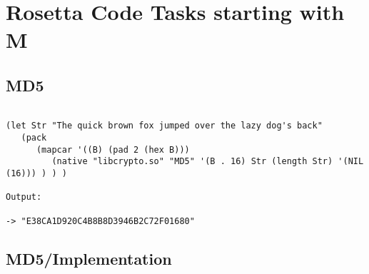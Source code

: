 \chapter{Rosetta Code Tasks starting with M}

\section*{MD5}

\begin{verbatim}

(let Str "The quick brown fox jumped over the lazy dog's back"
   (pack
      (mapcar '((B) (pad 2 (hex B)))
         (native "libcrypto.so" "MD5" '(B . 16) Str (length Str) '(NIL (16))) ) ) )

Output:

-> "E38CA1D920C4B8B8D3946B2C72F01680"

\end{verbatim}

\section*{MD5/Implementation}

